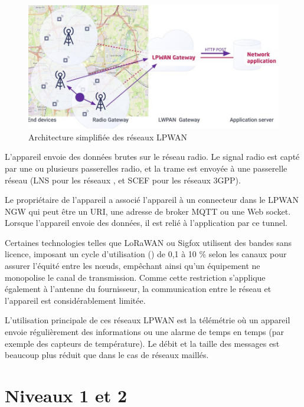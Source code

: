 \begin{figure}[tbp]
\centerline{\includegraphics[width=1\columnwidth]{Pictures/TolologieStar.jpg}}
\caption{Architecture simplifiée des réseaux LPWAN}
\label{fig-topo-star}
\end{figure}


L’appareil envoie des données brutes sur le réseau radio. Le signal radio est capté par une ou plusieurs passerelles radio, et la trame est envoyée à une passerelle réseau (\ac{LNS}  pour les réseaux , et \ac{SCEF} pour les réseaux \ac{3GPP}).

Le propriétaire de l’appareil a associé l’appareil à un connecteur dans le LPWAN \ac{NGW} qui peut être un \ac{URI}, une adresse de broker \ac{MQTT} ou une Web socket. Lorsque l’appareil envoie des données, il est relié à l’application par ce tunnel.

Certaines technologies telles que LoRaWAN ou Sigfox utilisent des bandes sans licence, imposant un cycle d’utilisation () de 0,1 à 10 \% selon les canaux pour assurer l’équité entre les nœuds, empêchant ainsi qu'un équipement ne monopolise le canal de transmission. Comme cette restriction s’applique également à l’antenne du fournisseur, la communication entre le réseau et l’appareil est considérablement limitée.

L’utilisation principale de ces réseaux \ac{LPWAN} est la télémétrie où un appareil envoie régulièrement des informations ou une alarme de temps en temps (par exemple des capteurs de température). Le débit et la taille des messages est beaucoup plus réduit que dans le cas de réseaux maillés.

    \vspace{1em}

\section{Niveaux 1 et 2}

